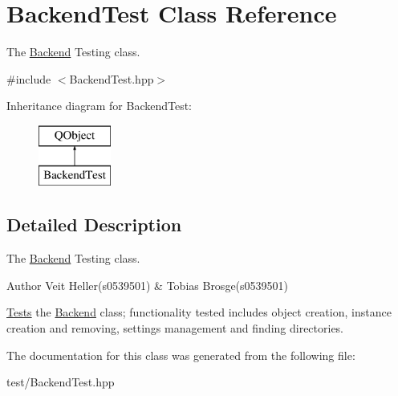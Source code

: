 \hypertarget{classBackendTest}{\section{Backend\+Test Class Reference}
\label{classBackendTest}
}


The \hyperlink{classBackend}{Backend} Testing class.  




{\ttfamily \#include $<$Backend\+Test.\+hpp$>$}

Inheritance diagram for Backend\+Test\+:\begin{figure}[H]
\begin{center}
\leavevmode
\includegraphics[height=2.000000cm]{classBackendTest}
\end{center}
\end{figure}


\subsection{Detailed Description}
The \hyperlink{classBackend}{Backend} Testing class. 

\begin{DoxyAuthor}{Author}
Veit Heller(s0539501) \& Tobias Brosge(s0539501)
\end{DoxyAuthor}
\hyperlink{structTests}{Tests} the \hyperlink{classBackend}{Backend} class; functionality tested includes object creation, instance creation and removing, settings management and finding directories. 

The documentation for this class was generated from the following file\+:\begin{DoxyCompactItemize}
\item 
test/Backend\+Test.\+hpp\end{DoxyCompactItemize}

